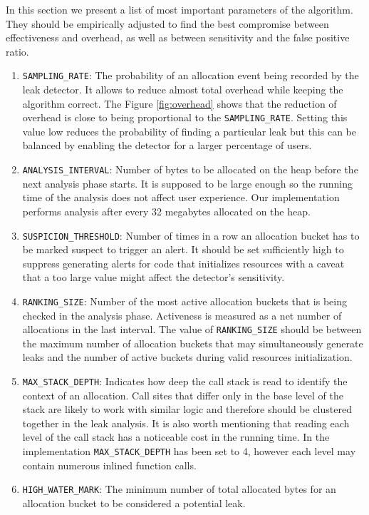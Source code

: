 \documentclass[preprint, numbers]{sigplanconf}
\begin{document}
In this section we present a list of most important parameters of the algorithm.
They should be empirically adjusted to find the best compromise between
effectiveness and overhead, as well as between sensitivity and the false positive ratio.

\begin{enumerate}

\item \texttt{SAMPLING\_RATE}: The probability of an allocation
	event being recorded by the leak detector.
	It allows to reduce almost total overhead while keeping the algorithm correct.
	The Figure \ref{fig:overhead} shows that the reduction of overhead is close
	to being proportional to the \texttt{SAMPLING\_RATE}.
	Setting this value low reduces the probability of finding a particular leak
	but this can be balanced by enabling the detector for a larger percentage of users.

\item \texttt{ANALYSIS\_INTERVAL}: Number of bytes to be allocated on the heap before the next
	analysis phase starts.
	It is supposed to be large enough so the running time of the analysis does not
	affect user experience.
	Our implementation performs analysis after every 32 megabytes allocated
	on the heap.

\item \texttt{SUSPICION\_THRESHOLD}: Number of times in a row an allocation bucket
	has to be marked suspect to trigger an alert.
	It should be set sufficiently high to suppress generating alerts for code that initializes resources
	with a caveat that a too large value might affect the detector's sensitivity.

\item \texttt{RANKING\_SIZE}: Number of the most active allocation buckets
	that is being checked in the analysis phase.
	Activeness is measured as a net number of allocations in the last interval.
	The value of \texttt{RANKING\_SIZE} should be between the maximum number
	of allocation buckets that may simultaneously generate leaks and the
	number of active buckets during valid resources initialization.

\item \texttt{MAX\_STACK\_DEPTH}: Indicates how deep the call stack is read to
	identify the context of an allocation.
	Call sites that differ only in the base level of the stack are likely to
	work with similar logic and therefore should be clustered together
	in the leak analysis.
	It is also worth mentioning that reading each level of the call stack
	has a noticeable cost in the running time.
	In the implementation \texttt{MAX\_STACK\_DEPTH} has been set to 4,
	however each level may contain numerous inlined function calls.

\item \texttt{HIGH\_WATER\_MARK}: The minimum number of total allocated bytes for an
	allocation bucket to be considered a potential leak.

\end{enumerate}
\end{document}
